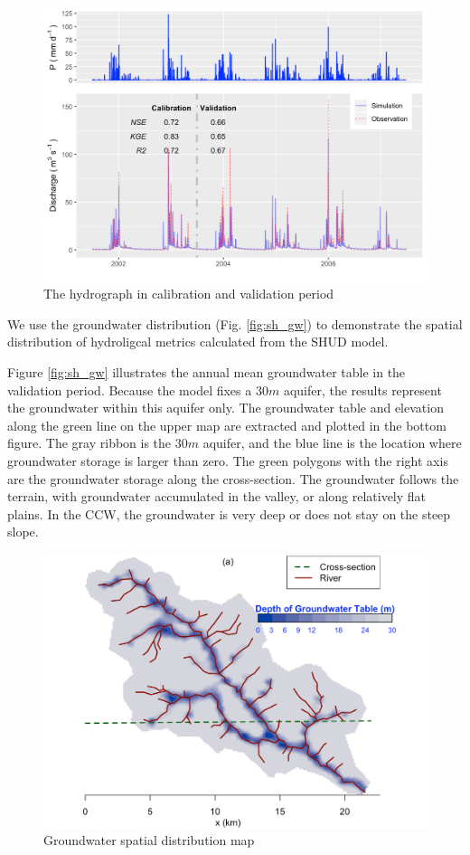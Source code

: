 \documentclass[]{scrbook}
\begin{document}
\begin{figure}
\centering
\includegraphics{Fig/Example/CacheCreek/sac5_hydrograph_daily.png}
\caption{The hydrograph in calibration and validation period}
\end{figure}

We use the groundwater distribution (Fig. \ref{fig:sh_gw}) to
demonstrate the spatial distribution of hydroligcal metrics calculated
from the SHUD model.

Figure \ref{fig:sh_gw} illustrates the annual mean groundwater table in
the validation period. Because the model fixes a \(30 m\) aquifer, the
results represent the groundwater within this aquifer only. The
groundwater table and elevation along the green line on the upper map
are extracted and plotted in the bottom figure. The gray ribbon is the
\(30 m\) aquifer, and the blue line is the location where groundwater
storage is larger than zero. The green polygons with the right axis are
the groundwater storage along the cross-section. The groundwater follows
the terrain, with groundwater accumulated in the valley, or along
relatively flat plains. In the CCW, the groundwater is very deep or does
not stay on the steep slope.

\begin{figure}
\centering
\includegraphics{Fig/Example/CacheCreek/sac5_rgw.png}
\caption{Groundwater spatial distribution map}
\end{figure}
\end{document}
